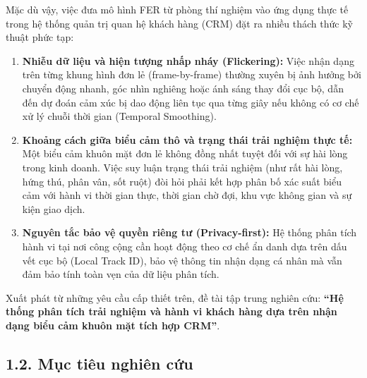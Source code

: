 Mặc dù vậy, việc đưa mô hình FER từ phòng thí nghiệm vào ứng dụng thực tế trong hệ thống quản trị quan hệ khách hàng (CRM) đặt ra nhiều thách thức kỹ thuật phức tạp:
\begin{enumerate}
    \item \textbf{Nhiễu dữ liệu và hiện tượng nhấp nháy (Flickering):} Việc nhận dạng trên từng khung hình đơn lẻ (frame-by-frame) thường xuyên bị ảnh hưởng bởi chuyển động nhanh, góc nhìn nghiêng hoặc ánh sáng thay đổi cục bộ, dẫn đến dự đoán cảm xúc bị dao động liên tục qua từng giây nếu không có cơ chế xử lý chuỗi thời gian (Temporal Smoothing).
    \item \textbf{Khoảng cách giữa biểu cảm thô và trạng thái trải nghiệm thực tế:} Một biểu cảm khuôn mặt đơn lẻ không đồng nhất tuyệt đối với sự hài lòng trong kinh doanh. Việc suy luận trạng thái trải nghiệm (như rất hài lòng, hứng thú, phân vân, sốt ruột) đòi hỏi phải kết hợp phân bố xác suất biểu cảm với hành vi thời gian thực, thời gian chờ đợi, khu vực không gian và sự kiện giao dịch.
    \item \textbf{Nguyên tắc bảo vệ quyền riêng tư (Privacy-first):} Hệ thống phân tích hành vi tại nơi công cộng cần hoạt động theo cơ chế ẩn danh dựa trên dấu vết cục bộ (Local Track ID), bảo vệ thông tin nhận dạng cá nhân mà vẫn đảm bảo tính toàn vẹn của dữ liệu phân tích.
\end{enumerate}

Xuất phát từ những yêu cầu cấp thiết trên, đề tài tập trung nghiên cứu: \textbf{``Hệ thống phân tích trải nghiệm và hành vi khách hàng dựa trên nhận dạng biểu cảm khuôn mặt tích hợp CRM''}.

\subsection*{1.2. Mục tiêu nghiên cứu}

